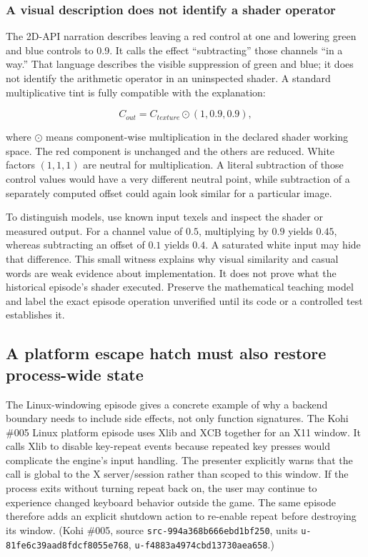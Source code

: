 \subsubsection{A visual description does not identify a shader operator}\label{a-visual-description-does-not-identify-a-shader-operator}

The 2D-API narration describes leaving a red control at one and lowering green and blue controls to 0.9. It calls the effect ``subtracting'' those channels ``in a way.'' That language describes the visible suppression of green and blue; it does not identify the arithmetic operator in an uninspected shader. A standard multiplicative tint is fully compatible with the explanation:

\[
C_{out}=C_{texture}\odot(1,0.9,0.9),
\]

where \(\odot\) means component-wise multiplication in the declared shader working space. The red component is unchanged and the others are reduced. White factors \((1,1,1)\) are neutral for multiplication. A literal subtraction of those control values would have a very different neutral point, while subtraction of a separately computed offset could again look similar for a particular image.

To distinguish models, use known input texels and inspect the shader or measured output. For a channel value of \(0.5\), multiplying by \(0.9\) yields \(0.45\), whereas subtracting an offset of \(0.1\) yields \(0.4\). A saturated white input may hide that difference. This small witness explains why visual similarity and casual words are weak evidence about implementation. It does not prove what the historical episode's shader executed. Preserve the mathematical teaching model and label the exact episode operation unverified until its code or a controlled test establishes it.

\subsection{A platform escape hatch must also restore process-wide state}\label{a-platform-escape-hatch-must-also-restore-process-wide-state}

The Linux-windowing episode gives a concrete example of why a backend boundary needs to include side effects, not only function signatures. The Kohi \#005 Linux platform episode uses Xlib and XCB together for an X11 window. It calls Xlib to disable key-repeat events because repeated key presses would complicate the engine's input handling. The presenter explicitly warns that the call is global to the X server/session rather than scoped to this window. If the process exits without turning repeat back on, the user may continue to experience changed keyboard behavior outside the game. The same episode therefore adds an explicit shutdown action to re-enable repeat before destroying its window. (Kohi \#005, source \texttt{src-994a368b666ebd1bf250}, units \texttt{u-81fe6c39aad8fdcf8055e768}, \texttt{u-f4883a4974cbd13730aea658}.)

